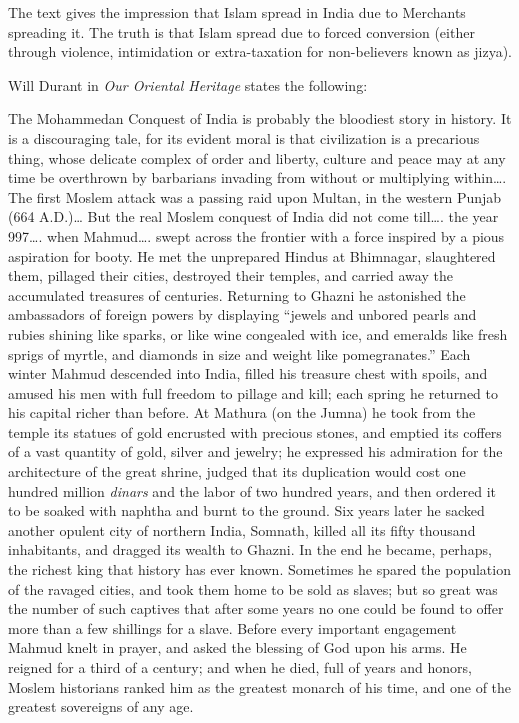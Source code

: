 The text gives the impression that Islam spread in India due to Merchants spreading it. The truth is that Islam spread due to forced conversion (either through violence, intimidation or extra-taxation for non-believers known as jizya). 

Will Durant in \textit{Our Oriental Heritage} states the following:

The Mohammedan Conquest of India is probably the bloodiest story in history. It is a discouraging tale, for its evident moral is that civilization is a precarious thing, whose delicate complex of order and liberty, culture and peace may at any time be overthrown by barbarians invading from without or multiplying within…. The first Moslem attack was a passing raid upon Multan, in the western Punjab (664 A.D.)… But the real Moslem conquest of India did not come till…. the year 997…. when Mahmud…. swept across the frontier with a force inspired by a pious aspiration for booty. He met the unprepared Hindus at Bhimnagar, slaughtered them, pillaged their cities, destroyed their temples, and carried away the accumulated treasures of centuries. Returning to Ghazni he astonished the ambassadors of foreign powers by displaying “jewels and unbored pearls and rubies shining like sparks, or like wine congealed with ice, and emeralds like fresh sprigs of myrtle, and diamonds in size and weight like pomegranates.” Each winter Mahmud descended into India, filled his treasure chest with spoils, and amused his men with full freedom to pillage and kill; each spring he returned to his capital richer than before. At Mathura (on the Jumna) he took from the temple its statues of gold encrusted with precious stones, and emptied its coffers of a vast quantity of gold, silver and jewelry; he expressed his admiration for the architecture of the great shrine, judged that its duplication would cost one hundred million \textit{dinars} and the labor of two hundred years, and then ordered it to be soaked with naphtha and burnt to the ground. Six years later he sacked another opulent city of northern India, Somnath, killed all its fifty thousand inhabitants, and dragged its wealth to Ghazni. In the end he became, perhaps, the richest king that history has ever known. Sometimes he spared the population of the ravaged cities, and took them home to be sold as slaves; but so great was the number of such captives that after some years no one could be found to offer more than a few shillings for a slave. Before every important engagement Mahmud knelt in prayer, and asked the blessing of God upon his arms. He reigned for a third of a century; and when he died, full of years and honors, Moslem historians ranked him as the greatest monarch of his time, and one of the greatest sovereigns of any age.

